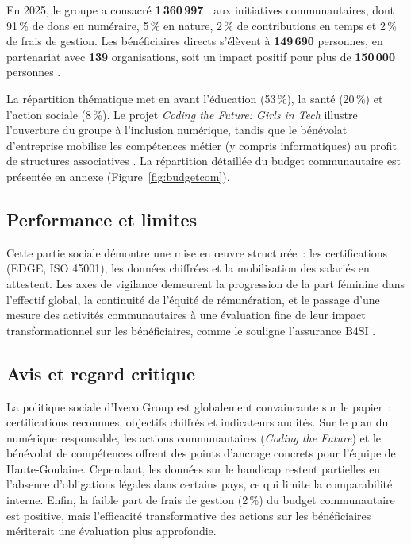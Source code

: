 En 2025, le groupe a consacré \textbf{1\,360\,997~\texteuro} aux initiatives communautaires, dont 91\,\% de dons en numéraire, 5\,\% en nature, 2\,\% de contributions en temps et 2\,\% de frais de gestion. Les bénéficiaires directs s'élèvent à \textbf{149\,690} personnes, en partenariat avec \textbf{139} organisations, soit un impact positif pour plus de \textbf{150\,000} personnes \cite{iveco_community_2025}.

La répartition thématique met en avant l'éducation (53\,\%), la santé (20\,\%) et l'action sociale (8\,\%). Le projet \textit{Coding the Future: Girls in Tech} illustre l'ouverture du groupe à l'inclusion numérique, tandis que le bénévolat d'entreprise mobilise les compétences métier (y compris informatiques) au profit de structures associatives \cite{iveco_community_2025, iveco_local_corp_2025}. La répartition détaillée du budget communautaire est présentée en annexe (Figure~\ref{fig:budgetcom}).

\subsection{Performance et limites}

Cette partie sociale démontre une mise en \oe{}uvre structurée~: les certifications (EDGE, ISO 45001), les données chiffrées et la mobilisation des salariés en attestent. Les axes de vigilance demeurent la progression de la part féminine dans l'effectif global, la continuité de l'équité de rémunération, et le passage d'une mesure des activités communautaires à une évaluation fine de leur impact transformationnel sur les bénéficiaires, comme le souligne l'assurance B4SI \cite{iveco_community_2025}.

\subsection*{Avis et regard critique}

La politique sociale d'Iveco Group est globalement convaincante sur le papier~: certifications reconnues, objectifs chiffrés et indicateurs audités. Sur le plan du numérique responsable, les actions communautaires (\textit{Coding the Future}) et le bénévolat de compétences offrent des points d'ancrage concrets pour l'équipe de Haute-Goulaine. Cependant, les données sur le handicap restent partielles en l'absence d'obligations légales dans certains pays, ce qui limite la comparabilité interne. Enfin, la faible part de frais de gestion (2\,\%) du budget communautaire est positive, mais l'efficacité transformative des actions sur les bénéficiaires mériterait une évaluation plus approfondie.
